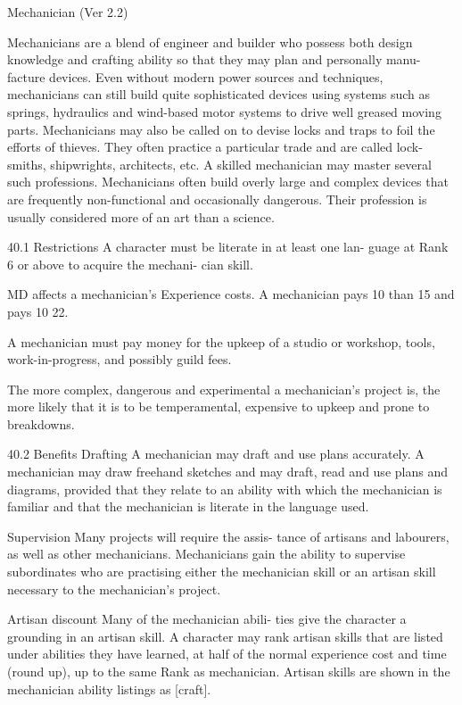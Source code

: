 \begin{Chapter}{Mechanician (Ver 2.2)}

Mechanicians  are  a  blend  of  engineer  and  builder 
who  possess  both  design  knowledge  and  crafting 
ability so that they may plan and personally manu-
facture  devices.  Even  without  modern  power 
sources  and  techniques,  mechanicians  can  still 
build  quite  sophisticated  devices  using  systems 
such  as  springs,  hydraulics  and  wind-based  motor 
systems  to  drive  well  greased  moving  parts. 
Mechanicians may also be called on to devise locks 
and  traps  to  foil  the  efforts  of  thieves.  They  often 
practice  a  particular  trade  and  are  called  lock-
smiths,  shipwrights,  architects,  etc.  A  skilled 
mechanician  may  master  several  such  professions. 
Mechanicians often build overly large and complex 
devices  that  are  frequently  non-functional  and 
occasionally dangerous. Their profession is usually 
considered more of an art than a science. 

40.1 Restrictions 
A  character  must  be  literate  in  at  least  one  lan-
guage  at Rank  6  or  above  to  acquire  the  mechani-
cian skill. 

MD  affects  a  mechanician’s  Experience  costs.  A 
mechanician pays 10%
than 15 and pays 10%
22. 

A mechanician must pay money for the upkeep of 
a studio or workshop, tools, work-in-progress, and 
possibly guild fees. 

The  more  complex,  dangerous  and  experimental  a 
mechanician’s  project  is,  the  more  likely  that  it  is 
to  be  temperamental,  expensive  to  upkeep  and 
prone to breakdowns. 

40.2 Benefits 
Drafting  A  mechanician  may  draft  and  use  plans 
accurately.  A  mechanician  may  draw  freehand 
sketches  and  may  draft,  read  and  use  plans  and 
diagrams,  provided  that  they  relate  to  an  ability 
with which the mechanician is familiar and that the 
mechanician is literate in the language used. 

Supervision  Many  projects  will  require  the  assis-
tance  of  artisans  and  labourers,  as  well  as  other 
mechanicians.  Mechanicians  gain  the  ability  to 
supervise  subordinates  who  are  practising  either 
the  mechanician  skill  or  an  artisan  skill  necessary 
to the mechanician’s project. 

Artisan  discount  Many  of  the  mechanician  abili-
ties  give  the  character  a  grounding  in  an  artisan 
skill.  A  character  may  rank  artisan  skills  that  are 
listed  under  abilities  they  have  learned,  at  half  of 
the normal experience cost and time (round up), up 
to the same Rank as mechanician. Artisan skills are 
shown in the mechanician ability listings as [craft]. 


\end{Chapter}
